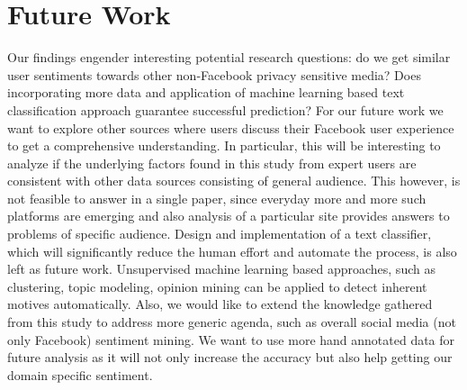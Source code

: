 \section{Future Work}
\label{sec:futurework}
Our findings engender interesting potential research questions: do we get similar user sentiments towards other non-Facebook privacy sensitive media? Does incorporating more data and application of machine learning based text classification approach guarantee successful prediction? For our future work we want to explore other sources where users discuss their Facebook user experience to get a comprehensive understanding. In particular, this will be interesting to analyze if the underlying factors found in this study from expert users are consistent with other data sources consisting of general audience. This however, is not feasible to answer in a single paper, since everyday more and more such platforms are emerging and also analysis of a particular site provides answers to problems of specific audience. Design and implementation of a text classifier, which will significantly reduce the human effort and automate the process, is also left as future work. Unsupervised machine learning based approaches, such as clustering, topic modeling, opinion mining can be applied to detect inherent motives automatically. Also, we would like to extend the knowledge gathered from this study to address more generic agenda, such as overall social media (not only Facebook) sentiment mining. We want to use more hand annotated data for future analysis as it will not only increase the accuracy but also help getting our domain specific sentiment.